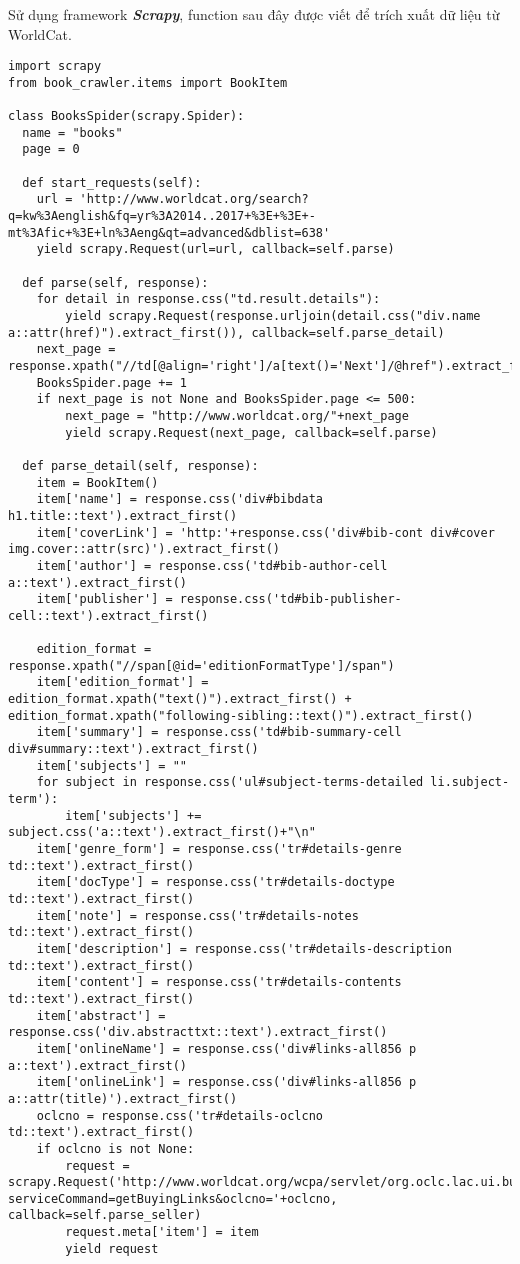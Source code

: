 Sử dụng framework \textbf{\textit{Scrapy}}, function sau đây được viết để trích xuất dữ liệu từ WorldCat.

\begin{lstlisting}[style=pythoncode, breaklines=true]
import scrapy
from book_crawler.items import BookItem

class BooksSpider(scrapy.Spider):
  name = "books"
  page = 0

  def start_requests(self):
	url = 'http://www.worldcat.org/search?q=kw%3Aenglish&fq=yr%3A2014..2017+%3E+%3E+-mt%3Afic+%3E+ln%3Aeng&qt=advanced&dblist=638'
	yield scrapy.Request(url=url, callback=self.parse)

  def parse(self, response):
	for detail in response.css("td.result.details"):
		yield scrapy.Request(response.urljoin(detail.css("div.name a::attr(href)").extract_first()), callback=self.parse_detail)
	next_page = response.xpath("//td[@align='right']/a[text()='Next']/@href").extract_first()
	BooksSpider.page += 1
	if next_page is not None and BooksSpider.page <= 500:
		next_page = "http://www.worldcat.org/"+next_page
		yield scrapy.Request(next_page, callback=self.parse)

  def parse_detail(self, response):
	item = BookItem()
	item['name'] = response.css('div#bibdata h1.title::text').extract_first()
	item['coverLink'] = 'http:'+response.css('div#bib-cont div#cover img.cover::attr(src)').extract_first()
	item['author'] = response.css('td#bib-author-cell a::text').extract_first()
	item['publisher'] = response.css('td#bib-publisher-cell::text').extract_first()	 
	
	edition_format = response.xpath("//span[@id='editionFormatType']/span")
	item['edition_format'] = edition_format.xpath("text()").extract_first() + edition_format.xpath("following-sibling::text()").extract_first()
	item['summary'] = response.css('td#bib-summary-cell div#summary::text').extract_first()
	item['subjects'] = ""
	for subject in response.css('ul#subject-terms-detailed li.subject-term'):
		item['subjects'] += subject.css('a::text').extract_first()+"\n"
	item['genre_form'] = response.css('tr#details-genre td::text').extract_first()
	item['docType'] = response.css('tr#details-doctype td::text').extract_first()
	item['note'] = response.css('tr#details-notes td::text').extract_first()
	item['description'] = response.css('tr#details-description td::text').extract_first()
	item['content'] = response.css('tr#details-contents td::text').extract_first()
	item['abstract'] = response.css('div.abstracttxt::text').extract_first()
	item['onlineName'] = response.css('div#links-all856 p a::text').extract_first()
	item['onlineLink'] = response.css('div#links-all856 p a::attr(title)').extract_first()
	oclcno = response.css('tr#details-oclcno td::text').extract_first()
	if oclcno is not None:
		request = scrapy.Request('http://www.worldcat.org/wcpa/servlet/org.oclc.lac.ui.buying.AjaxBuyingLinksServlet?serviceCommand=getBuyingLinks&oclcno='+oclcno, callback=self.parse_seller)
		request.meta['item'] = item
		yield request


\end{lstlisting}
